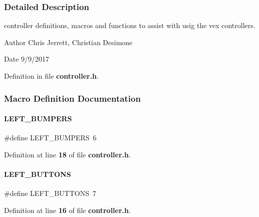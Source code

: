\subsubsection{Detailed Description}
controller definitions, macros and functions to assist with usig the vex controllers. 

\begin{DoxyAuthor}{Author}
Chris Jerrett, Christian Desimone 
\end{DoxyAuthor}
\begin{DoxyDate}{Date}
9/9/2017 
\end{DoxyDate}


Definition in file \textbf{ controller.\+h}.



\subsubsection{Macro Definition Documentation}
\mbox{\label{a00011_ad61eb6d28a76985afb8d39ef925541bb}} 
\paragraph{L\+E\+F\+T\+\_\+\+B\+U\+M\+P\+E\+RS}
{\footnotesize\ttfamily \#define L\+E\+F\+T\+\_\+\+B\+U\+M\+P\+E\+RS~6}



Definition at line \textbf{ 18} of file \textbf{ controller.\+h}.

\mbox{\label{a00011_a9b885de9f143efd0c862ceb054256536}} 
\paragraph{L\+E\+F\+T\+\_\+\+B\+U\+T\+T\+O\+NS}
{\footnotesize\ttfamily \#define L\+E\+F\+T\+\_\+\+B\+U\+T\+T\+O\+NS~7}



Definition at line \textbf{ 16} of file \textbf{ controller.\+h}.

\mbox{\label{a00011_ac055a23829dc64aa20b8e2e1bcfbf316}} 
